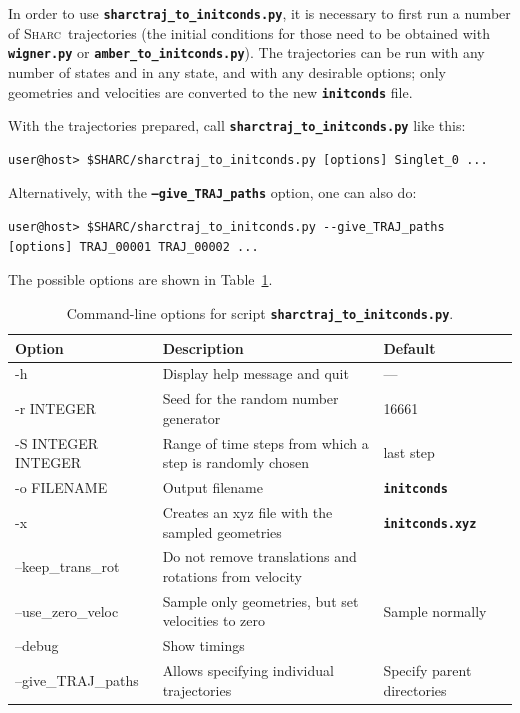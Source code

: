\documentclass[a4paper,10pt,DIV=15,openany]{scrbook}
\newcommand{\sharc}{\textsc{Sharc}}
\newcommand{\ttt}[1]{\textbf{\texttt{#1}}}
\begin{document}
In order to use \ttt{sharctraj\_to\_initconds.py}, it is necessary to first run a number of \sharc\ trajectories (the initial conditions for those need to be obtained with \ttt{wigner.py} or \ttt{amber\_to\_initconds.py}).
The trajectories can be run with any number of states and in any state, and with any desirable options; only geometries and velocities are converted to the new \ttt{initconds} file.

With the trajectories prepared, call \ttt{sharctraj\_to\_initconds.py} like this:
\begin{verbatim}
user@host> $SHARC/sharctraj_to_initconds.py [options] Singlet_0 ...
\end{verbatim}
Alternatively, with the \ttt{--give\_TRAJ\_paths} option, one can also do:
\begin{verbatim}
user@host> $SHARC/sharctraj_to_initconds.py --give_TRAJ_paths [options] TRAJ_00001 TRAJ_00002 ...
\end{verbatim}
The possible options are shown in Table~\ref{tab:sharctraj_opts}.

\begin{table}
  \centering
  \caption{Command-line options for script \ttt{sharctraj\_to\_initconds.py}.}
  \label{tab:sharctraj_opts}
  \begin{tabular}{>{\ttfamily}lp{8.5cm}l}
    \hline
    \rmfamily Option        &Description      &Default\\
    \hline
    -h                  &Display help message and quit              &---                            \\
    -r  INTEGER         &Seed for the random number generator       &16661                          \\
    -S INTEGER INTEGER  &Range of time steps from which a step is randomly chosen       &last step  \\
    -o  FILENAME        &Output filename                            &\ttt{initconds}                \\
    -x                  &Creates an xyz file with the sampled geometries &\ttt{initconds.xyz}       \\
    --keep\_trans\_rot  &Do not remove translations and rotations from velocity &\\
    --use\_zero\_veloc  &Sample only geometries, but set velocities to zero     &Sample normally\\
    --debug             &Show timings                                           &\\
    --give\_TRAJ\_paths &Allows specifying individual trajectories &Specify parent directories\\
    \hline
  \end{tabular}
\end{table}
\end{document}
